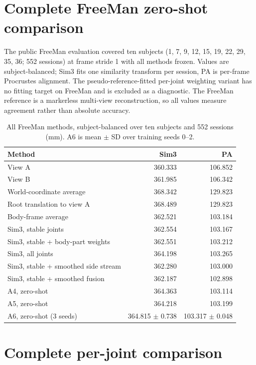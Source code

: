 \documentclass[pdflatex,sn-mathphys-num]{sn-jnl}
\begin{document}
\section{Complete FreeMan zero-shot comparison}

The public FreeMan evaluation covered ten subjects (1, 7, 9, 12, 15, 19, 22,
29, 35, 36; 552 sessions) at frame stride 1 with all methods frozen. Values
are subject-balanced; Sim3 fits one similarity transform per session, PA is
per-frame Procrustes alignment. The pseudo-reference-fitted per-joint
weighting variant has no fitting target on FreeMan and is excluded as a
diagnostic. The FreeMan reference is a markerless multi-view reconstruction,
so all values measure agreement rather than absolute accuracy.

\begin{table}[h]
\caption{All FreeMan methods, subject-balanced over ten subjects and 552
sessions (mm). A6 is mean $\pm$ SD over training seeds 0--2.}
\label{tab:freeman-full}
\centering
\small
\begin{tabular}{lrr}
\toprule
Method & Sim3 & PA\\
\midrule
View A & 360.333 & 106.852\\
View B & 361.985 & 106.342\\
World-coordinate average & 368.342 & 129.823\\
Root translation to view A & 368.489 & 129.823\\
Body-frame average & 362.521 & 103.184\\
Sim3, stable joints & 362.554 & 103.167\\
Sim3, stable + body-part weights & 362.551 & 103.212\\
Sim3, all joints & 364.198 & 103.265\\
Sim3, stable + smoothed side stream & 362.280 & 103.000\\
Sim3, stable + smoothed fusion & 362.187 & 102.898\\
A4, zero-shot & 364.363 & 103.114\\
A5, zero-shot & 364.218 & 103.199\\
A6, zero-shot (3 seeds) & 364.815 $\pm$ 0.738 & 103.317 $\pm$ 0.048\\
\bottomrule
\end{tabular}
\end{table}

\section{Complete per-joint comparison}
\end{document}

